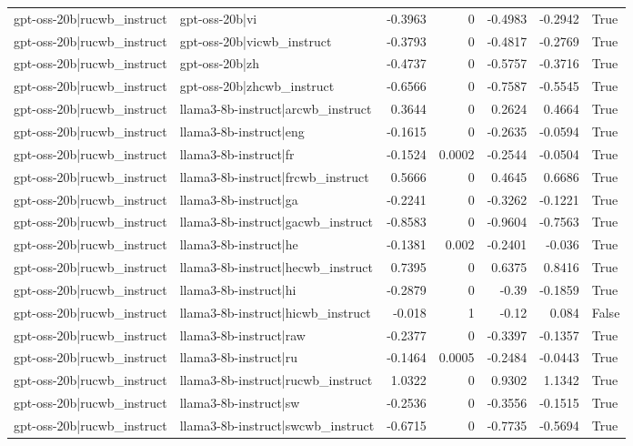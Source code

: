 \begin{table}
\begin{tabular}{l l r r r r l}
gpt-oss-20b|rucwb_instruct & gpt-oss-20b|vi & -0.3963 & 0 & -0.4983 & -0.2942 & True \\
gpt-oss-20b|rucwb_instruct & gpt-oss-20b|vicwb_instruct & -0.3793 & 0 & -0.4817 & -0.2769 & True \\
gpt-oss-20b|rucwb_instruct & gpt-oss-20b|zh & -0.4737 & 0 & -0.5757 & -0.3716 & True \\
gpt-oss-20b|rucwb_instruct & gpt-oss-20b|zhcwb_instruct & -0.6566 & 0 & -0.7587 & -0.5545 & True \\
gpt-oss-20b|rucwb_instruct & llama3-8b-instruct|arcwb_instruct & 0.3644 & 0 & 0.2624 & 0.4664 & True \\
gpt-oss-20b|rucwb_instruct & llama3-8b-instruct|eng & -0.1615 & 0 & -0.2635 & -0.0594 & True \\
gpt-oss-20b|rucwb_instruct & llama3-8b-instruct|fr & -0.1524 & 0.0002 & -0.2544 & -0.0504 & True \\
gpt-oss-20b|rucwb_instruct & llama3-8b-instruct|frcwb_instruct & 0.5666 & 0 & 0.4645 & 0.6686 & True \\
gpt-oss-20b|rucwb_instruct & llama3-8b-instruct|ga & -0.2241 & 0 & -0.3262 & -0.1221 & True \\
gpt-oss-20b|rucwb_instruct & llama3-8b-instruct|gacwb_instruct & -0.8583 & 0 & -0.9604 & -0.7563 & True \\
gpt-oss-20b|rucwb_instruct & llama3-8b-instruct|he & -0.1381 & 0.002 & -0.2401 & -0.036 & True \\
gpt-oss-20b|rucwb_instruct & llama3-8b-instruct|hecwb_instruct & 0.7395 & 0 & 0.6375 & 0.8416 & True \\
gpt-oss-20b|rucwb_instruct & llama3-8b-instruct|hi & -0.2879 & 0 & -0.39 & -0.1859 & True \\
gpt-oss-20b|rucwb_instruct & llama3-8b-instruct|hicwb_instruct & -0.018 & 1 & -0.12 & 0.084 & False \\
gpt-oss-20b|rucwb_instruct & llama3-8b-instruct|raw & -0.2377 & 0 & -0.3397 & -0.1357 & True \\
gpt-oss-20b|rucwb_instruct & llama3-8b-instruct|ru & -0.1464 & 0.0005 & -0.2484 & -0.0443 & True \\
gpt-oss-20b|rucwb_instruct & llama3-8b-instruct|rucwb_instruct & 1.0322 & 0 & 0.9302 & 1.1342 & True \\
gpt-oss-20b|rucwb_instruct & llama3-8b-instruct|sw & -0.2536 & 0 & -0.3556 & -0.1515 & True \\
gpt-oss-20b|rucwb_instruct & llama3-8b-instruct|swcwb_instruct & -0.6715 & 0 & -0.7735 & -0.5694 & True \\

\end{tabular}
\end{table}
